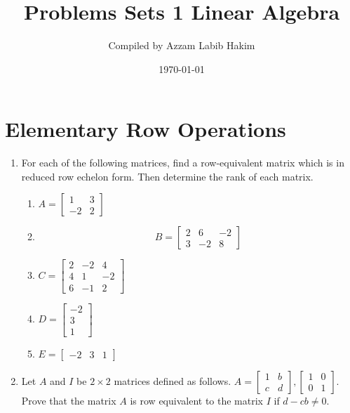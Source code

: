 \documentclass[12pt]{scrartcl}
\title{Problems Sets 1 Linear Algebra}
\author{Compiled by Azzam Labib Hakim}
\date{\today}
\begin{document}
\maketitle


\section{Elementary Row Operations}
\begin{enumerate}

\item For each of the following matrices, find a row-equivalent matrix which is in reduced row echelon form. Then determine the rank of each matrix.

\begin{enumerate}
\item $A = \begin{bmatrix}
1 & 3 \\
-2 & 2
\end{bmatrix}
$

\item $$B = \begin{bmatrix}
2 & 6 & -2 \\
3 & -2 & 8
\end{bmatrix}
$$

\item $C = \begin{bmatrix}
2 & -2 & 4 \\
4 & 1 & -2 \\
6 & -1 & 2
\end{bmatrix}
$

\item $ D = \begin{bmatrix}
-2 \\
3 \\
1
\end{bmatrix}
$

\item $E = \begin{bmatrix}
-2 & 3 & 1
\end{bmatrix}
$
\end{enumerate}

\item Let $A$ and $I$ be $2 \times 2$ matrices defined as follows.
$A = \begin{bmatrix}
1 & b \\
c & d
\end{bmatrix}, \begin{bmatrix}
1 & 0 \\
0 & 1
\end{bmatrix}.$
Prove that the matrix $A$ is row equivalent to the matrix $I$ if $d-cb \neq 0$.

\end{enumerate}
\end{document}
